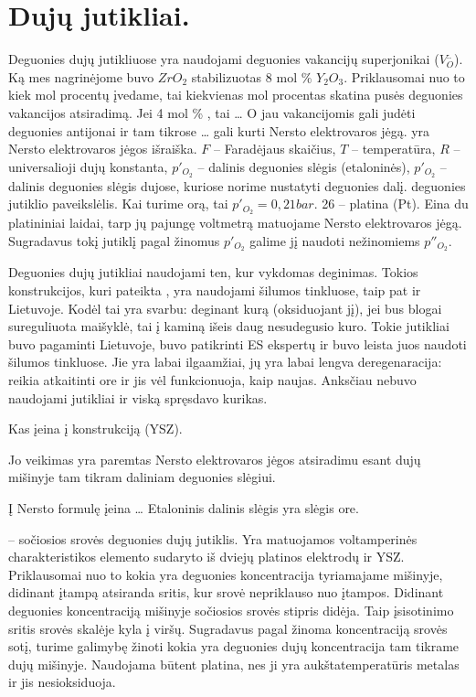 \section{Dujų jutikliai.}

Deguonies dujų jutikliuose yra naudojami deguonies vakancijų
superjonikai ($V_{O}^{..}$). Ką mes nagrinėjome buvo
$ZrO_{2}$ stabilizuotas 8 mol \% $Y_{2}O_{3}$. Priklausomai nuo
to kiek mol procentų įvedame, tai kiekvienas mol procentas skatina
pusės deguonies vakancijos atsiradimą. Jei 4 mol \% , tai …
O jau vakancijomis gali judėti deguonies antijonai ir tam tikrose
… gali kurti Nersto elektrovaros jėgą.  yra Nersto
elektrovaros jėgos išraiška. $F$ – Faradėjaus skaičius, $T$ – temperatūra,
$R$ – universalioji dujų konstanta, $p'_{O_{2}}$ – dalinis deguonies
slėgis (etaloninės), $p'_{O_{2}}$ – dalinis deguonies slėgis dujose,
kuriose norime nustatyti deguonies dalį.  deguonies jutiklio
paveikslėlis. Kai turime orą, tai $p'_{O_{2}} = 0,21 bar$.
26 – platina (Pt). Eina du platininiai laidai, tarp jų pajungę voltmetrą
matuojame Nersto elektrovaros jėgą. Sugradavus tokį jutiklį pagal žinomus
$p'_{O_{2}}$ galime jį naudoti nežinomiems $p''_{O_2}$.

Deguonies dujų jutikliai naudojami ten, kur vykdomas deginimas. Tokios
konstrukcijos, kuri pateikta , yra naudojami šilumos
tinkluose, taip pat ir Lietuvoje. Kodėl tai yra svarbu: deginant kurą
(oksiduojant jį), jei bus blogai sureguliuota maišyklė, tai į kaminą
išeis daug nesudegusio kuro. Tokie jutikliai buvo pagaminti Lietuvoje,
buvo patikrinti ES ekspertų ir buvo leista juos naudoti šilumos tinkluose.
Jie yra labai ilgaamžiai, jų yra labai lengva deregenaracija: reikia
atkaitinti ore ir jis vėl funkcionuoja, kaip naujas. Anksčiau nebuvo
naudojami jutikliai ir viską spręsdavo kurikas.

\begin{remember}
  \item Kas įeina į konstrukciją (YSZ).
  \item Jo veikimas yra paremtas Nersto elektrovaros jėgos atsiradimu
    esant dujų mišinyje tam tikram daliniam deguonies slėgiui.
  \item Į Nersto formulę įeina …
    Etaloninis dalinis slėgis yra slėgis ore.
\end{remember}

 – sočiosios srovės deguonies dujų jutiklis. Yra
matuojamos voltamperinės charakteristikos elemento sudaryto iš dviejų
platinos elektrodų ir YSZ. Priklausomai nuo to kokia yra deguonies
koncentracija tyriamajame mišinyje, didinant įtampą atsiranda sritis,
kur srovė nepriklauso nuo įtampos. Didinant deguonies koncentraciją
mišinyje sočiosios srovės stipris didėja. Taip įsisotinimo sritis
srovės skalėje kyla į viršų. Sugradavus pagal žinoma
koncentraciją srovės sotį, turime galimybę žinoti kokia yra
deguonies dujų koncentracija tam tikrame dujų mišinyje.
Naudojama būtent platina, nes ji yra aukštatemperatūris metalas ir
jis nesioksiduoja.


